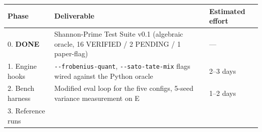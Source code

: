 \documentclass[
  11pt,
]{article}
\begin{document}
\begin{longtable}[]{@{}lll@{}}
\toprule
\begin{minipage}[b]{0.30\columnwidth}\raggedright
Phase\strut
\end{minipage} & \begin{minipage}[b]{0.30\columnwidth}\raggedright
Deliverable\strut
\end{minipage} & \begin{minipage}[b]{0.30\columnwidth}\raggedright
Estimated effort\strut
\end{minipage}\tabularnewline
\midrule
\endhead
\begin{minipage}[t]{0.30\columnwidth}\raggedright
0. \textbf{DONE}\strut
\end{minipage} & \begin{minipage}[t]{0.30\columnwidth}\raggedright
Shannon-Prime Test Suite v0.1 (algebraic oracle, 16 VERIFIED / 2 PENDING
/ 1 paper-flag)\strut
\end{minipage} & \begin{minipage}[t]{0.30\columnwidth}\raggedright
---\strut
\end{minipage}\tabularnewline
\begin{minipage}[t]{0.30\columnwidth}\raggedright
1. Engine hooks\strut
\end{minipage} & \begin{minipage}[t]{0.30\columnwidth}\raggedright
\texttt{-\/-frobenius-quant}, \texttt{-\/-sato-tate-mix} flags wired
against the Python oracle\strut
\end{minipage} & \begin{minipage}[t]{0.30\columnwidth}\raggedright
2--3 days\strut
\end{minipage}\tabularnewline
\begin{minipage}[t]{0.30\columnwidth}\raggedright
2. Bench harness\strut
\end{minipage} & \begin{minipage}[t]{0.30\columnwidth}\raggedright
Modified eval loop for the five configs, 5-seed variance measurement on
E\strut
\end{minipage} & \begin{minipage}[t]{0.30\columnwidth}\raggedright
1--2 days\strut
\end{minipage}\tabularnewline
\begin{minipage}[t]{0.30\columnwidth}\raggedright
3. Reference runs\strut
\end{minipage} & \begin{minipage}[t]{0.30\columnwidth}\raggedright

\end{minipage}
\end{longtable}
\end{document}

